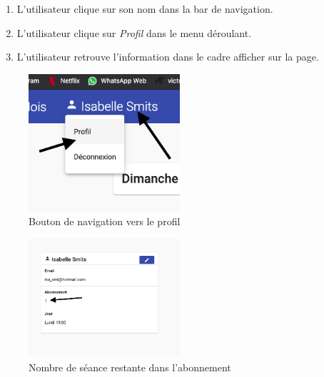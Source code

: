 \begin{enumerate}
	\item L'utilisateur clique sur son nom dans la bar de navigation.
	\item L'utilisateur clique sur \textit{Profil} dans le menu déroulant.
	\item L'utilisateur retrouve l'information dans le cadre afficher sur la page.
\end{enumerate}

\newpage
\begin{figure}[h]
	\includegraphics[width=0.5\textwidth,center]{Figures/us7-1}
	\caption{Bouton de navigation vers le profil}
\end{figure}

\vspace{\baselineskip}
\begin{figure}[h]
	\includegraphics[width=0.5\textwidth,center]{Figures/us7-2}
	\caption{Nombre de séance restante dans l'abonnement}
\end{figure}

